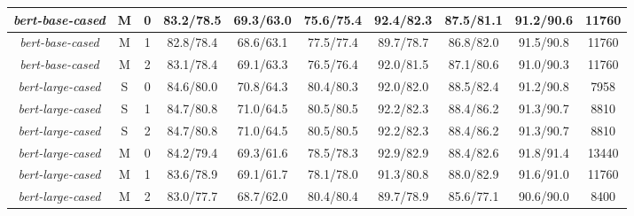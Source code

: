 \begin{table*}
\begin{tabular}{|c|c|c||c|c|c|c|c|c||c|}
\textit{bert-base-cased} & M & 0 & 83.2/78.5 & 69.3/63.0 & 75.6/75.4 & 92.4/82.3 & 87.5/81.1 & 91.2/90.6 & 11760 \\ \hline
\textit{bert-base-cased} & M & 1 & 82.8/78.4 & 68.6/63.1 & 77.5/77.4 & 89.7/78.7 & 86.8/82.0 & 91.5/90.8 & 11760 \\ \hline
\textit{bert-base-cased} & M & 2 & 83.1/78.4 & 69.1/63.3 & 76.5/76.4 & 92.0/81.5 & 87.1/80.6 & 91.0/90.3 & 11760 \\ \hline
\textit{bert-large-cased} & S & 0 & 84.6/80.0 & 70.8/64.3 & 80.4/80.3 & 92.0/82.0 & 88.5/82.4 & 91.2/90.8 & 7958 \\ \hline
\textit{bert-large-cased} & S & 1 & 84.7/80.8 & 71.0/64.5 & 80.5/80.5 & 92.2/82.3 & 88.4/86.2 & 91.3/90.7 & 8810 \\ \hline
\textit{bert-large-cased} & S & 2 & 84.7/80.8 & 71.0/64.5 & 80.5/80.5 & 92.2/82.3 & 88.4/86.2 & 91.3/90.7 & 8810 \\ \hline
\textit{bert-large-cased} & M & 0 & 84.2/79.4 & 69.3/61.6 & 78.5/78.3 & 92.9/82.9 & 88.4/82.6 & 91.8/91.4 & 13440 \\ \hline
\textit{bert-large-cased} & M & 1 & 83.6/78.9 & 69.1/61.7 & 78.1/78.0 & 91.3/80.8 & 88.0/82.9 & 91.6/91.0 & 11760 \\ \hline
\textit{bert-large-cased} & M & 2 & 83.0/77.7 & 68.7/62.0 & 80.4/80.4 & 89.7/78.9 & 85.6/77.1 & 90.6/90.0 & 8400 \\ \hline
\end{tabular}
\end{table*}


